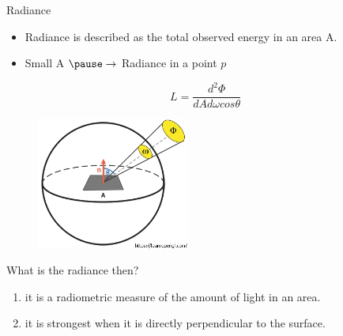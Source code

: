 \documentclass[]{beamer}
\begin{document}


\begin{frame}


  \textcolor{mypink1}{Radiance} 
\vspace{5mm}
\pause


\begin{itemize}
  \item Radiance is described as the total observed energy in an area A.\pause
  \item Small A $\pause \rightarrow$ Radiance in a point $p$
\end{itemize}

\pause

\begin{equation*}
  L=\frac{d^2\Phi}{d Ad \omega cos \theta}
\end{equation*}

\begin{figure}[h!]
  \begin{center}
    \includegraphics[height=1.7in]{images/19.jpg}
  \end{center}
\end{figure}

\end{frame}





\begin{frame}
  \textcolor{mypink1}{What is the radiance then?} 
\pause
  \begin{enumerate}
    \item  it is a radiometric measure of the amount of light in an area.\pause
    \item  it  is strongest when it is directly perpendicular to the surface.

  \end{enumerate}







\end{frame}
\end{document}
